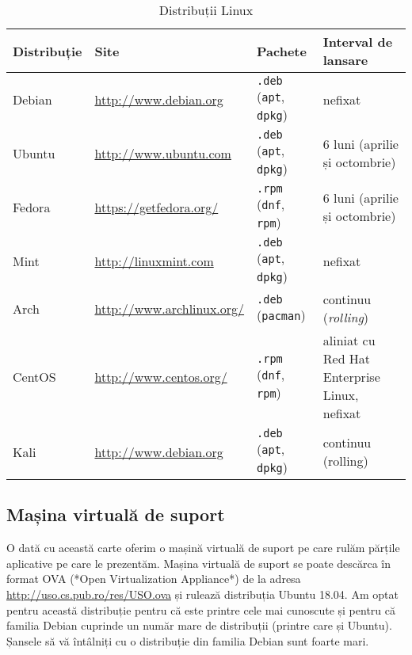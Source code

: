 \begin{table}[!htb]
  \caption{Distribuții Linux}
  \begin{center}
    \begin{tabular}{ p{} p{} p{} p{} }
      \toprule
        \textbf{Distribuție} &
        \textbf{Site} &
        \textbf{Pachete} &
        \textbf{Interval de lansare} \\
      \midrule
        Debian &
        \url{http://www.debian.org} &
        \texttt{.deb} (\texttt{apt}, \texttt{dpkg}) &
        nefixat \\
        Ubuntu &
        \url{http://www.ubuntu.com} &
        \texttt{.deb} (\texttt{apt}, \texttt{dpkg}) &
        6 luni (aprilie și octombrie) \\
        Fedora &
        \url{https://getfedora.org/} &
        \texttt{.rpm} (\texttt{dnf}, \texttt{rpm}) &
        6 luni (aprilie și octombrie) \\
        Mint &
        \url{http://linuxmint.com} &
        \texttt{.deb} (\texttt{apt}, \texttt{dpkg}) &
        nefixat \\
        Arch &
        \url{http://www.archlinux.org/} &
        \texttt{.deb} (\texttt{pacman}) &
        continuu (\textit{rolling}) \\
        CentOS &
        \url{http://www.centos.org/} &
        \texttt{.rpm} (\texttt{dnf}, \texttt{rpm}) &
        aliniat cu Red Hat Enterprise Linux, nefixat\\
        Kali &
        \url{http://www.debian.org} &
        \texttt{.deb} (\texttt{apt}, \texttt{dpkg}) &
        continuu (rolling) \\
      \bottomrule
    \end{tabular}
    \label{tab:intro:distro}
  \end{center}
\end{table}

\subsection{Mașina virtuală de suport}
\label{sec:intro:vm}

O dată cu această carte oferim o mașină virtuală de suport pe care rulăm părțile aplicative pe care le prezentăm. Mașina virtuală de suport se poate descărca în format OVA (*Open Virtualization Appliance*) de la adresa \url{http://uso.cs.pub.ro/res/USO.ova} și rulează distribuția Ubuntu 18.04. Am optat pentru această distribuție pentru că este printre cele mai cunoscute și pentru că familia Debian cuprinde un număr mare de distribuții (printre care și Ubuntu). Șansele să vă întâlniți cu o distribuție din familia Debian sunt foarte mari.

